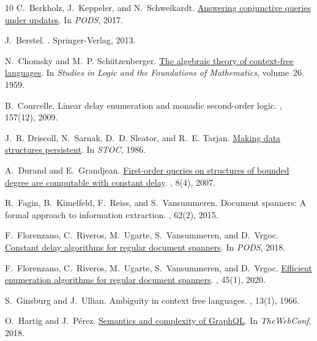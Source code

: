 \begin{thebibliography}{10}
C.~Berkholz, J.~Keppeler, and N.~Schweikardt.
\newblock \href{https://arxiv.org/abs/1702.06370}{Answering conjunctive queries
  under updates}.
\newblock In {\em PODS}, 2017.

J.~Berstel.
.
\newblock Springer-Verlag, 2013.

N.~Chomsky and M.~P. Sch{\"u}tzenberger.
\newblock
  \href{http://www-igm.univ-mlv.fr/~berstel/Mps/Travaux/A/1963-7ChomskyAlgebraic.pdf}{The
  algebraic theory of context-free languages}.
\newblock In {\em Studies in Logic and the Foundations of Mathematics},
  volume~26. 1959.

B.~Courcelle.
\newblock Linear delay enumeration and monadic second-order logic.
, 157(12), 2009.

J.~R. Driscoll, N.~Sarnak, D.~D. Sleator, and R.~E. Tarjan.
\newblock
  \href{https://www.sciencedirect.com/science/article/pii/0022000089900342}{Making
  data structures persistent}.
\newblock In {\em STOC}, 1986.

A.~Durand and E.~Grandjean.
\newblock
  \href{https://hal.archives-ouvertes.fr/hal-00195016/document}{First-order
  queries on structures of bounded degree are computable with constant delay}.
, 8(4), 2007.

R.~Fagin, B.~Kimelfeld, F.~Reiss, and S.~Vansummeren.
\newblock Document spanners: {A} formal approach to information extraction.
, 62(2), 2015.

F.~Florenzano, C.~Riveros, M.~Ugarte, S.~Vansummeren, and D.~Vrgoc.
\newblock \href{https://arxiv.org/abs/1803.05277}{Constant delay algorithms for
  regular document spanners}.
\newblock In {\em PODS}, 2018.

F.~Florenzano, C.~Riveros, M.~Ugarte, S.~Vansummeren, and D.~Vrgoc.
\newblock \href{http://criveros.sitios.ing.uc.cl/papers/tods20.pdf}{Efficient
  enumeration algorithms for regular document spanners}.
, 45(1), 2020.

S.~Ginsburg and J.~Ullian.
\newblock Ambiguity in context free languages.
, 13(1), 1966.

O.~Hartig and J.~P{\'e}rez.
\newblock \href{https://dl.acm.org/doi/abs/10.1145/3178876.3186014}{Semantics
  and complexity of GraphQL}.
\newblock In {\em TheWebConf}, 2018.


\end{thebibliography}
